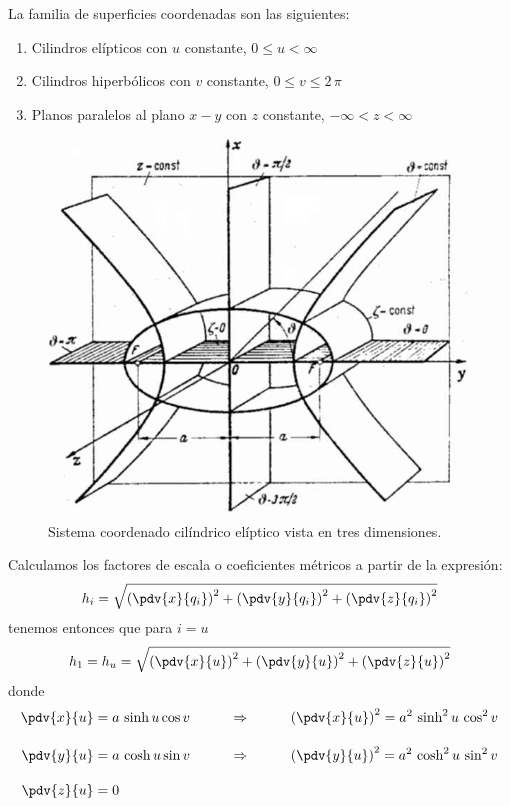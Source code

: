 La familia de superficies coordenadas son las siguientes:
\begin{enumerate}
\item Cilindros elípticos con $u$ constante, $0 \leq u < \infty$
\item Cilindros hiperbólicos con $v$ constante, $0 \leq v \leq 2 \, \pi$
\item Planos paralelos al plano $x-y$ con $z$ constante, $-\infty < z < \infty$
\end{enumerate}
\begin{figure}[H]
    \centering
    \includegraphics[scale=0.5]{Imagenes/Elliptic-cylindrical-coordinates_02.png}
    \caption{Sistema coordenado cilíndrico elíptico vista en tres dimensiones.}
    \label{fig:figura_coordenada_cilindricas_elipticas_3D}
\end{figure}
Calculamos los factores de escala o coeficientes métricos a partir de la expresión:
\begin{align*}
h_{i} = \sqrt{ \left( \pdv{x}{q_{i}} \right)^{2} + \left( \pdv{y}{q_{i}} \right)^{2} + \left( \pdv{z}{q_{i}} \right)^{2}}
\end{align*}
tenemos entonces que para $ i = u$
\begin{align*}
h_{1} = h_{u} = \sqrt{ \left( \pdv{x}{u} \right)^{2} + \left( \pdv{y}{u} \right)^{2} + \left( \pdv{z}{u} \right)^{2}}
\end{align*}
donde
\begin{align*}
\pdv{x}{u} &= a \, \sinh u \cos v \hspace{1cm} \Rightarrow \hspace{1cm} \left( \pdv{x}{u} \right)^{2} = a^{2} \, \sinh^{2} u \, \cos^{2} v \\[1em]
\pdv{y}{u} &= a \, \cosh u \sin v \hspace{1cm} \Rightarrow \hspace{1cm} \left( \pdv{y}{u} \right)^{2} = a^{2} \, \cosh^{2} u \, \sin^{2} v \\[1em]
\pdv{z}{u} &= 0
\end{align*}
